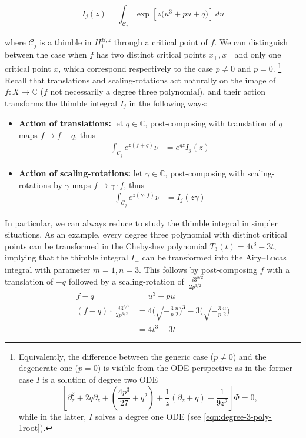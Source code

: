 \documentclass{article}
\newcommand{\C}{\mathbb{C}}
\theoremstyle{definition}
\theoremstyle{plain}
\begin{document}
\[ I_j(z) = \int_{\mathcal{C}_j} \exp\left[z\big(u^3 + pu + q)\right]\,du \]

where $\mathcal{C}_j$ is a thimble in $H_{1}^{B,z}$ through a critical point of $f$. We can distinguish between the case when $f$ has two distinct critical points $x_+, x_-$ and only one critical point $x$, which correspond respectively to the case $p\neq 0$ and $p=0$. \footnote{Equivalently, the difference between the generic case ($p\neq 0$) and the degenerate one ($p=0$) is visible from the ODE perspective as in the former case $I$ is a solution of degree two ODE \[\left[\partial_z^2 +2q \partial_z+\left(\frac{4p^3}{27}+q^2\right)+\frac{1}{z}\left(\partial_z +q \right)-\frac{1}{9z^2}\right]\Phi=0,\] while in the latter, $I$ solves a degree one ODE (see \eqref{eqn:degree-3-poly-1root}).}
Recall that translations and scaling-rotations act naturally on the image of $f\colon X\to \C$ ($f$ not necessarily a degree three polynomial), and their action transforms the thimble integral $I_j$ in the following ways:
\begin{itemize}
    \item \textbf{Action of translations:} let $q\in\C$, post-composing with translation of $q$ maps $f\to f+q$, thus 
    \begin{align*}
        \int_{\mathcal{C}_j}e^{z (f+q)} \nu &= e^{qz} I_j(z)
    \end{align*}
    \item  \textbf{Action of scaling-rotations:} let $\gamma\in\C$, post-composing with scaling-rotations by $\gamma$ maps $f\to \gamma\cdot f$, thus 
    \begin{align*}
        \int_{\mathcal{C}_j}e^{z (\gamma\cdot f)} \nu &= I_j(z \gamma)
    \end{align*}
\end{itemize}
In particular, we can always reduce to study the thimble integral in simpler situations. 
As an example, every degree three polynomial with distinct critical points can be transformed in the Chebyshev polynomial $T_3(t)=4 t^3-3t$, implying that the thimble integral $I_+$ can be transformed into the Airy--Lucas integral with parameter $m=1, n=3$. This follows by post-composing $f$ with a translation of $-q$ followed by a scaling-rotation of $\frac{ -i 3^{3/2}}{2 p^{3/2}}$
\begin{align*}
    f-q &= u^3 + pu \\
    (f-q) \cdot \frac{ -i 3^{3/2}}{2 p^{3/2}} &= 4 \Big(\sqrt{-\tfrac{3}{p}} \tfrac{u}{2} \Big)^{3} - 3\Big(\sqrt{-\tfrac{3}{p}} \tfrac{u}{2} \Big) \\
    &= 4 t^3- 3t 
\end{align*}
\end{document}
